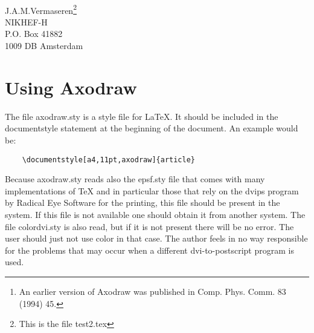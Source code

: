 \documentclass[11pt,a4paper]{article}
\begin{document}
\begin{center}
{\Huge {}} \\
\vspace{3cm}
{\LARGE  J.A.M.Vermaseren}\footnote{This is the file test2.tex} \\
\vspace{4mm}
NIKHEF-H \\ P.O. Box 41882 \\ 1009 DB Amsterdam \\ \vspace{5mm}
\end{center}

\vspace{5cm}

\begin{abstract}
Axodraw is a set of drawing primitives for use in \LaTeX. These can be used 
for the drawing of Feynman diagrams, flow charts and simple graphics. 
Because it uses postscript for its drawing commands it works only in 
combination with the dvips of Radical Eye Software which is presently the 
most popular dvips program. More will be added in the future. It allows 
whole articles including their pictures to be contained in a single file, 
thereby making it easier to exchange the article file by e-mail. The 
current version\footnote{An earlier version of Axodraw was published 
in Comp. Phys. Comm. 83 (1994) 45.} supports color according to the scheme 
implemented in the file colordvi.sty which comes with most \TeX{} 
distributions.
\end{abstract}

\newpage

\section{Using Axodraw}

The file axodraw.sty is a style file for \LaTeX{}. It should be included 
in the documentstyle statement at the beginning of the 
document. An example would be: \IfColor{\textBlue}{}
\begin{verbatim}
    \documentstyle[a4,11pt,axodraw]{article}
\end{verbatim}
\IfColor{\textBlack}{}
Because axodraw.sty reads also the epsf.sty file that comes with many 
implementations of \TeX{} and in particular those that rely on the dvips 
program by Radical Eye Software for the printing, this file should be 
present in the system. If this file is not available one should obtain it 
from another system. The file colordvi.sty is also read, but if it is not 
present there will be no error. The user should just not use color in that 
case. The author feels in no way responsible for the problems that may 
occur when a different dvi-to-postscript program is used.
\end{document}
